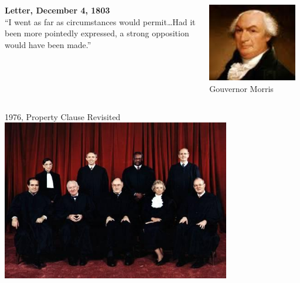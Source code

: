 \begin{frame}
    \begin{columns}[onlytextwidth]
            \textbf{Letter, December 4, 1803} \\
            ``I went as far as circumstances would permit\ldots Had it been
            more pointedly expressed, a strong opposition would have been made.''

            \centering
            \includegraphics[width=0.95\textwidth]{img/morris-portrait.png} \\
            Gouvernor Morris \\
    \end{columns}
\end{frame}

\begin{frame}{1976, Property Clause Revisited}
    \centering
    \includegraphics[width=0.75\textwidth]{img/sc-1976.png} \\
\end{frame}

